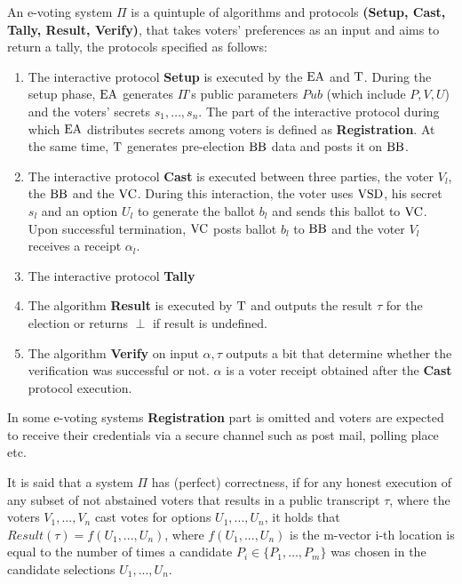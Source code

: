 An e-voting system $\Pi$ is a quintuple of algorithms and protocols  \textbf{(Setup, Cast, Tally, Result, Verify)}, that takes  voters' preferences as an input and aims to return a tally, the protocols specified as follows:
\begin{enumerate}
\item The interactive protocol \textbf{Setup} is executed by the $\operatorname{EA}$ and $\operatorname{T}$. During the setup phase, $\operatorname{EA}$ generates $\Pi$'s public parameters $Pub$ (which include $P, V, U$) and the voters' secrets $s_1, \dots , s_n$. The part of the interactive protocol during which $\operatorname{EA}$ distributes secrets among voters is defined as \textbf{Registration}. At the same time, $\operatorname{T}$ generates pre-election $\operatorname{BB}$ data and posts it on $\operatorname{BB}$.
\item The interactive protocol \textbf{Cast} is executed between three parties, the voter $V_l$, the $\operatorname{BB}$ and the $\operatorname{VC}$. During this interaction, the voter uses $\operatorname{VSD}$, his secret $s_l$ and an option $U_l$ to generate the ballot $b_l$ and sends this ballot to $\operatorname{VC}$. Upon successful termination, $\operatorname{VC}$ posts ballot $b_l$ to $\operatorname{BB}$ and the voter $V_l$ receives a receipt $\alpha_l$.
\item The interactive protocol \textbf{Tally}
\item The algorithm \textbf{Result} is executed by $\operatorname{T}$ and outputs the result $\tau$ for the election or returns $\perp$ if result is undefined.
\item  The algorithm \textbf{Verify} on input $\alpha,\tau$ outputs a bit that determine whether the verification was successful or not.  $\alpha$ is a voter receipt obtained after the \textbf{Cast} protocol execution.
\end{enumerate}
In some e-voting systems \textbf{Registration} part is omitted and voters are expected to receive their credentials via a secure channel such as post mail, polling place etc.
\begin{definition}
It is said that a system $\Pi$ has (perfect) correctness, if for any honest execution of any subset of not abstained voters that results in a public transcript $\tau$, where the voters $V_1, . . . , V_n$ cast votes for options $U_1, . . . , U_n$, it holds that $Result(\tau) = f(U_1,...,U_n)$, where $f(U_1,...,U_n)$ is the m-vector  i-th location is equal to the number of times a candidate $P_i \in \{P_1,\dots, P_m\}$ was chosen in the candidate selections $U_1, . . . , U_n$.
\end{definition}
